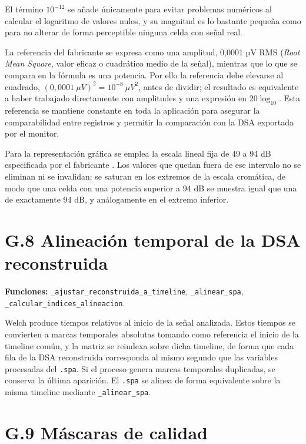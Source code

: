 \documentclass[
  spanish,
  a4paper,
  12pt,
  twoside]{memoir}
\begin{document}
El término \(10^{-12}\) se añade únicamente para evitar problemas
numéricos al calcular el logaritmo de valores nulos, y su magnitud es lo
bastante pequeña como para no alterar de forma perceptible ninguna celda
con señal real.

La referencia del fabricante se expresa como una amplitud, 0,0001 µV RMS
(\emph{Root Mean Square}, valor eficaz o cuadrático medio de la señal),
mientras que lo que se compara en la fórmula es una potencia. Por ello
la referencia debe elevarse al cuadrado,
\((0{,}0001\ \mu V)^2 = 10^{-8}\ \mu V^2\), antes de dividir; el
resultado es equivalente a haber trabajado directamente con amplitudes y
una expresión en \(20 \log_{10}\). Esta referencia se mantiene constante
en toda la aplicación para asegurar la comparabilidad entre registros y
permitir la comparación con la DSA exportada por el monitor.

Para la representación gráfica se emplea la escala lineal fija de 49 a
94 dB especificada por el fabricante
\citep{CovidienBISVista, CovidienVISTABilateral}. Los valores que quedan
fuera de ese intervalo no se eliminan ni se invalidan: se saturan en los
extremos de la escala cromática, de modo que una celda con una potencia
superior a 94 dB se muestra igual que una de exactamente 94 dB, y
análogamente en el extremo inferior.

\chapter{G.8 Alineación temporal de la DSA
reconstruida}\label{g.8-alineaciuxf3n-temporal-de-la-dsa-reconstruida}

\textbf{Funciones:} \texttt{\_ajustar\_reconstruida\_a\_timeline},
\texttt{\_alinear\_spa}, \texttt{\_calcular\_indices\_alineacion}.

Welch produce tiempos relativos al inicio de la señal analizada. Estos
tiempos se convierten a marcas temporales absolutas tomando como
referencia el inicio de la timeline común, y la matriz se reindexa sobre
dicha timeline, de forma que cada fila de la DSA reconstruida
corresponda al mismo segundo que las variables procesadas del
\texttt{.spa}. Si el proceso genera marcas temporales duplicadas, se
conserva la última aparición. El \texttt{.spa} se alinea de forma
equivalente sobre la misma timeline mediante \texttt{\_alinear\_spa}.

\chapter{G.9 Máscaras de calidad}\label{g.9-muxe1scaras-de-calidad}
\end{document}
